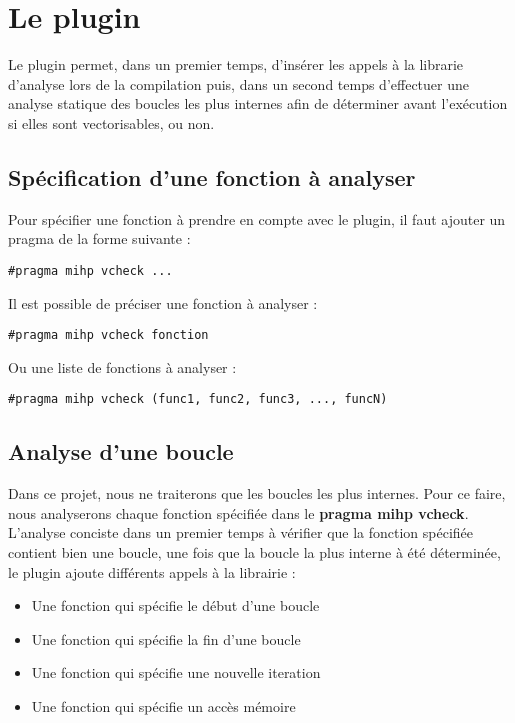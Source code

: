 \documentclass[12pt,french]{article}
\begin{document}
\section{\color{blue}Le plugin}

Le plugin permet, dans un premier temps, d'insérer les appels à la librarie d'analyse lors de la compilation puis, dans un second temps d'effectuer une analyse statique des boucles les plus internes afin de déterminer avant l'exécution si elles sont vectorisables, ou non.

	\subsection{\color{blue}Spécification d'une fonction à analyser}

Pour spécifier une fonction à prendre en compte avec le plugin, il faut ajouter un pragma de la forme suivante :

\begin{center}
\color{green}
\begin{lstlisting}
#pragma mihp vcheck ...
\end{lstlisting}
\end{center}

Il est possible de préciser une fonction à analyser :

\begin{center}
\color{green}
\begin{lstlisting}
#pragma mihp vcheck fonction
\end{lstlisting}
\end{center}

Ou une liste de fonctions à analyser :

\begin{center}
\color{green}
\begin{lstlisting}
#pragma mihp vcheck (func1, func2, func3, ..., funcN)
\end{lstlisting}
\end{center}

	\subsection{\color{blue}Analyse d'une boucle}

Dans ce projet, nous ne traiterons que les boucles les plus internes. Pour ce faire, nous analyserons chaque fonction spécifiée dans le \textbf{pragma mihp vcheck}. L'analyse conciste dans un premier temps à vérifier que la fonction spécifiée contient bien une boucle, une fois que la boucle la plus interne à été déterminée, le plugin ajoute différents appels à la librairie :
\vspace{0.5cm}
\begin{itemize}
\item Une fonction qui spécifie le début d'une boucle
\item Une fonction qui spécifie la fin d'une boucle
\item Une fonction qui spécifie une nouvelle iteration
\item Une fonction qui spécifie un accès mémoire
\end{itemize}
\vspace{0.5cm}
\end{document}

